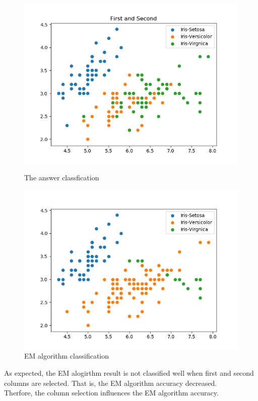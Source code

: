 \documentclass[a4paper]{article}
\begin{document}
	\clearpage
	\begin{figure}[h!]
		\centering
		\begin{minipage}[t]{6.5cm}
			\includegraphics[width=1.0\textwidth]{12.png}
			\caption{The answer classfication}
		\end{minipage}
		\hspace{2cm}
		\begin{minipage}[t]{6.5cm}
			\includegraphics[width=1.0\textwidth]{12_p.png}
			\caption{EM algorithm classification}
		\end{minipage}
	\end{figure}
	
	As expected, the EM alogirthm result is not classified well when first and second columns are selected. That is, the EM algorithm accuracy decreased.\\ 
	Therfore, the column selection influences the EM algorithm accuracy.
\end{document}
